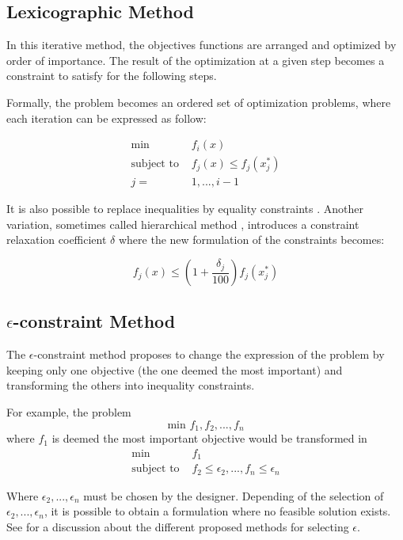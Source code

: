 \subsection{Lexicographic Method}

In this iterative method, the objectives functions are arranged and optimized by order of importance. The result of the optimization at a given step becomes a constraint to satisfy for the following steps.

Formally, the problem becomes an ordered set of optimization problems, where each iteration can be expressed as follow:

\begin{align*}
\text{min } &f_i(x) \\
\text{subject to } &f_j(x) \leq f_j(x_j^*) \\
j = &1, ..., i-1
\end{align*}

It is also possible to replace inequalities by equality constraints \cite{stadler1988multicriteria}. Another variation, sometimes called hierarchical method \cite{osyczka1984multicriterion}, introduces a constraint relaxation coefficient $\delta$ where the new formulation of the constraints becomes:

\[ f_j(x) \leq \left(1 + \frac{\delta_j}{100}\right) f_j(x_j^*) \]

\subsection{$\epsilon$-constraint Method}

The $\epsilon$-constraint method \cite{4308298} proposes to change the expression of the problem by keeping only one objective (the one deemed the most important) and transforming the others into inequality constraints.

For example, the problem \[\text{min } f_1, f_2, ...,f_n\] where $f_1$ is deemed the most important objective would be transformed in
\begin{align*}
\text{min } &f_1 \\
\text{subject to } &f_2 \leq \epsilon_2, ..., f_n \leq \epsilon_n
\end{align*}

Where $\epsilon_2, ..., \epsilon_n$ must be chosen by the designer.
Depending of the selection of $\epsilon_2, ..., \epsilon_n$, it is possible to obtain a formulation where no feasible solution exists.
See \cite{marler2004survey} for a discussion about the different proposed methods for selecting $\epsilon$.


